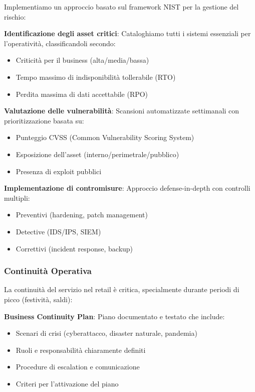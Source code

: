 Implementiamo un approccio basato sul framework NIST per la gestione del rischio:

\textbf{Identificazione degli asset critici}: Cataloghiamo tutti i sistemi essenziali per l'operatività, classificandoli secondo:
\begin{itemize}
    \item Criticità per il business (alta/media/bassa)
    \item Tempo massimo di indisponibilità tollerabile (RTO)
    \item Perdita massima di dati accettabile (RPO)
\end{itemize}

\textbf{Valutazione delle vulnerabilità}: Scansioni automatizzate settimanali con prioritizzazione basata su:
\begin{itemize}
    \item Punteggio CVSS (Common Vulnerability Scoring System)
    \item Esposizione dell'asset (interno/perimetrale/pubblico)
    \item Presenza di exploit pubblici
\end{itemize}

\textbf{Implementazione di contromisure}: Approccio defense-in-depth con controlli multipli:
\begin{itemize}
    \item Preventivi (hardening, patch management)
    \item Detective (IDS/IPS, SIEM)
    \item Correttivi (incident response, backup)
\end{itemize}

\subsubsection{\texorpdfstring{Continuità Operativa}{4.4.3.2 - Continuità Operativa}}

La continuità del servizio nel retail è critica, specialmente durante periodi di picco (festività, saldi):

\textbf{Business Continuity Plan}: Piano documentato e testato che include:
\begin{itemize}
    \item Scenari di crisi (cyberattacco, disaster naturale, pandemia)
    \item Ruoli e responsabilità chiaramente definiti
    \item Procedure di escalation e comunicazione
    \item Criteri per l'attivazione del piano
\end{itemize}

